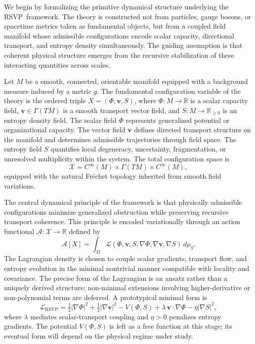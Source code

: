 \documentclass[12pt,a4paper]{article}
\newcommand{\RSVP}{\textrm{RSVP}}
\newcommand{\Field}{\mathcal{X}}
\newcommand{\R}{\mathbb{R}}
\begin{document}
We begin by formalizing the primitive dynamical structure underlying the \RSVP\
framework. The theory is constructed not from particles, gauge bosons, or
spacetime metrics taken as fundamental objects, but from a coupled field manifold
whose admissible configurations encode scalar capacity, directional transport,
and entropy density simultaneously. The guiding assumption is that coherent
physical structure emerges from the recursive stabilization of these interacting
quantities across scales.

Let $M$ be a smooth, connected, orientable manifold equipped with a background
measure induced by a metric $g$. The fundamental configuration variable of the
theory is the ordered triple $X=(\Phi,\mathbf{v},S)$, where $\Phi : M \to \R$
is a scalar capacity field, $\mathbf{v} \in \Gamma(TM)$ is a smooth transport
vector field, and $S : M \to \R_{\geq 0}$ is an entropy density field. The
scalar field $\Phi$ represents generalized potential or organizational capacity.
The vector field $\mathbf{v}$ defines directed transport structure on the
manifold and determines admissible trajectories through field space. The entropy
field $S$ quantifies local degeneracy, uncertainty, fragmentation, or unresolved
multiplicity within the system. The total configuration space is
\[
\Field = C^\infty(M)\times\Gamma(TM)\times C^\infty(M),
\]
equipped with the natural Fr\'{e}chet topology inherited from smooth field
variations.

The central dynamical principle of the framework is that physically admissible
configurations minimize generalized obstruction while preserving recursive
transport coherence. This principle is encoded variationally through an action
functional $\mathcal{A}:\Field\to\R$ defined by
\[
\mathcal{A}[X]
= \int_M
\mathcal{L}(\Phi,\mathbf{v},S,\nabla\Phi,\nabla\mathbf{v},\nabla S)
\, d\mu_g.
\]
The Lagrangian density is chosen to couple scalar gradients, transport flow,
and entropy evolution in the minimal nontrivial manner compatible with locality
and covariance. The precise form of the Lagrangian is an ansatz rather than a
uniquely derived structure; non-minimal extensions involving higher-derivative
or non-polynomial terms are deferred. A prototypical minimal form is
\[
\mathcal{L}_\RSVP
= \tfrac{1}{2}|\nabla\Phi|^2
+ \tfrac{1}{2}|\nabla\mathbf{v}|^2
- V(\Phi,S)
+ \lambda\,\mathbf{v}\cdot\nabla\Phi
- \eta|\nabla S|^2,
\]
where $\lambda$ mediates scalar-transport coupling and $\eta>0$ penalizes
entropy gradients. The potential $V(\Phi,S)$ is left as a free function at this
stage; its eventual form will depend on the physical regime under study.
\end{document}
